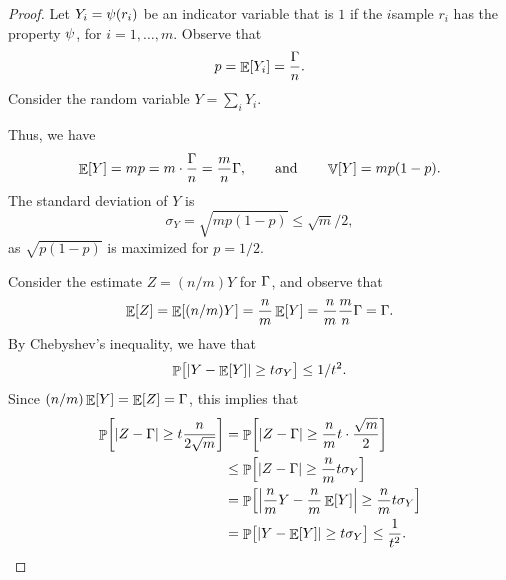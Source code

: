 \begin{proof}
    Let $Y_i = \propertyX{r_i}$ be an indicator variable that is $1$
    if the $i$\th sample $r_i$ has the property $\psi$, for
    $i=1,\ldots, m$.  Observe that
    \begin{equation*}
        p = \mathop{\mathbb{E}}\!\left[ {Y_i} \right] = \frac{\Gamma}{n}.
    \end{equation*}
    Consider the random variable $Y = \sum_i Y_i$.


    \smallskip%
    Thus, we have
    \begin{equation*}
        \Ex{Y}
        =%
        mp
        =%
        m \cdot \frac{\numC}{n}
        =%
        \frac{m}{n} \numC,
        \qquad\text{and}\qquad
        \Var{Y}
        =%
        mp(1-p).
    \end{equation*}
    The standard deviation of $Y$ is
    \begin{equation*}
        \sigma_Y = \sqrt{m p (1-p)}\leq \sqrt{m}/2,
    \end{equation*}
    as $\sqrt{p(1-p)}$ is maximized for $p=1/2$.

    Consider the estimate $Z= (n/m)Y$ for $\Gamma$, and observe that
    \begin{equation*}
        \Ex{Z}
        =%
        \Ex{ (n/m)Y}%
        =%
        \frac{n}{m}\Ex{ Y}
        =%
        \frac{n}{m} \frac{m}{n} \numC = \numC.
    \end{equation*}
    By Chebyshev's inequality, we have that
    \begin{equation*}
        \Prob{\bigl. \cardin{Y - \Ex{Y} } \geq t \sigma_Y }%
        \leq%
        {1}/{t^2}.
    \end{equation*}
    Since $(n/m)\mathop{\mathbb{E}}\!\left[ {Y} \right] = \mathop{\mathbb{E}}\!\left[ {Z} \right] = \Gamma$, this implies that
    \begin{align*}
      \Prob{\bigl. \cardin{Z - \numC } \geq t \frac{n}{2\sqrt{m}} }%
      &=
        \Prob{\bigl. \cardin{Z - \numC } \geq
        \frac{n}{m}t \cdot \frac{\sqrt{m}}{2} }%
      \\&
        \leq
        \Prob{\bigl. \cardin{Z - \numC } \geq
        \frac{n}{m}t \sigma_Y }%
      \\&
        =
        \Prob{\bigl. \cardin{\frac{n}{m}Y - \frac{n}{m} \Ex{Y} } \geq
        \frac{n}{m}t \sigma_Y }%
      \\&%
      =%
      \Prob{\bigl. \cardin{Y - \Ex{Y} } \geq t \sigma_Y }%
      \leq
      \frac{1}{t^2}.
    \end{align*}
\end{proof}

